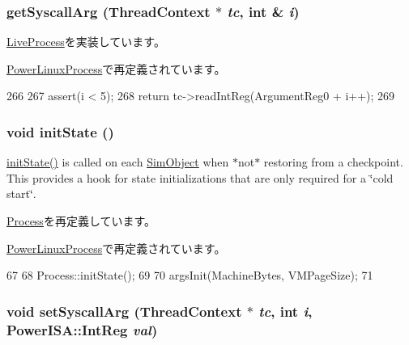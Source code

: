 \hypertarget{classPowerLiveProcess_a4a1521e60b3fd8333fc98a5565c484ec}{
\subsubsection[{getSyscallArg}]{ getSyscallArg ({\bf ThreadContext} $\ast$ {\em tc}, \/  int \& {\em i})}}
\label{classPowerLiveProcess_a4a1521e60b3fd8333fc98a5565c484ec}


\hyperlink{classLiveProcess_aa001ff57ec460026facb89ba19c7bf96}{LiveProcess}を実装しています。

\hyperlink{classPowerLinuxProcess_a4a1521e60b3fd8333fc98a5565c484ec}{PowerLinuxProcess}で再定義されています。


\begin{DoxyCode}
266 {
267     assert(i < 5);
268     return tc->readIntReg(ArgumentReg0 + i++);
269 }
\end{DoxyCode}
\hypertarget{classPowerLiveProcess_a3c34ea9b29f410748d4435a667484924}{
\subsubsection[{initState}]{\setlength{\rightskip}{0pt plus 5cm}void initState ()}}
\label{classPowerLiveProcess_a3c34ea9b29f410748d4435a667484924}
\hyperlink{classPowerLiveProcess_a3c34ea9b29f410748d4435a667484924}{initState()} is called on each \hyperlink{classSimObject}{SimObject} when $\ast$not$\ast$ restoring from a checkpoint. This provides a hook for state initializations that are only required for a \char`\"{}cold start\char`\"{}. 

\hyperlink{classProcess_a3c34ea9b29f410748d4435a667484924}{Process}を再定義しています。

\hyperlink{classPowerLinuxProcess_a3c34ea9b29f410748d4435a667484924}{PowerLinuxProcess}で再定義されています。


\begin{DoxyCode}
67 {
68     Process::initState();
69 
70     argsInit(MachineBytes, VMPageSize);
71 }
\end{DoxyCode}
\hypertarget{classPowerLiveProcess_a1e515b39cc799824d1dd93d40ba28416}{
\subsubsection[{setSyscallArg}]{\setlength{\rightskip}{0pt plus 5cm}void setSyscallArg ({\bf ThreadContext} $\ast$ {\em tc}, \/  int {\em i}, \/  {\bf PowerISA::IntReg} {\em val})}}
\label{classPowerLiveProcess_a1e515b39cc799824d1dd93d40ba28416}


